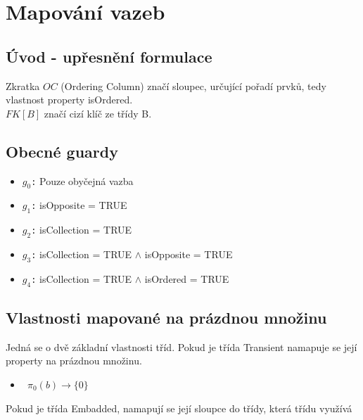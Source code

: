 \documentclass[11pt,a4paper]{article}
\begin{document}
\section{Mapování vazeb}
	\subsection{Úvod - upřesnění formulace}
	Zkratka $OC$ (Ordering Column) značí sloupec, určující pořadí prvků, tedy vlastnost property isOrdered. \\
	$FK[B]$ značí cizí klíč ze třídy B.
	
	\subsection{Obecné guardy}
	     \begin{itemize}
	     	\item $ g_0 $\texttt : {Pouze obyčejná vazba}				
         	\item $ g_1 $\texttt : {isOpposite = TRUE}
         	\item $ g_2 $\texttt : {isCollection = TRUE}
         	\item $ g_3 $\texttt : {isCollection = TRUE $\wedge$ isOpposite = TRUE}
         	\item $ g_4 $\texttt : {isCollection = TRUE $\wedge$ isOrdered = TRUE}    		  							
   		\end{itemize}						                                
	\subsection{Vlastnosti mapované na prázdnou množinu}
   		Jedná se o dvě základní vlastnosti tříd. Pokud je třída 
   		Transient namapuje se její property na prázdnou množinu. 
   		\begin{itemize}				    
         	\item \texttt	{
         					$\pi_0(b) \to \{ 0\}$  
         					}
   		\end{itemize}
   		Pokud je třída Embadded, namapují se její sloupce do třídy, která třídu využívá\\
\end{document}
